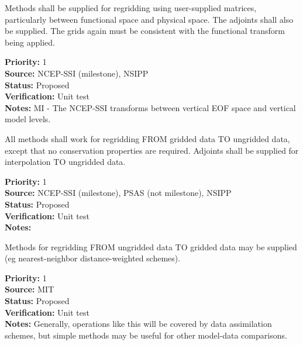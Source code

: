
Methods shall be supplied for regridding using user-supplied matrices,
particularly between functional space and physical space.
The adjoints shall also be supplied.  The grids again must be consistent
with the functional transform being applied.

\begin{reqlist}
{\bf Priority:} 1 \\
{\bf Source:}  NCEP-SSI (milestone), NSIPP \\
{\bf Status:} Proposed \\
{\bf Verification:} Unit test \\
{\bf Notes:} MI - The NCEP-SSI transforms between vertical EOF space
             and vertical model levels.
\end{reqlist}


All methods shall work for regridding FROM gridded data TO ungridded
data, except that no conservation properties are required.
Adjoints shall be supplied for interpolation TO ungridded data.

\begin{reqlist}
{\bf Priority:} 1 \\
{\bf Source:}  NCEP-SSI (milestone), PSAS (not milestone), NSIPP  \\
{\bf Status:} Proposed \\
{\bf Verification:} Unit test \\
{\bf Notes:} 
\end{reqlist}


Methods for regridding FROM ungridded data TO gridded data may be
supplied (eg nearest-neighbor distance-weighted schemes).

\begin{reqlist}
{\bf Priority:} 1 \\
{\bf Source:} MIT  \\
{\bf Status:} Proposed \\
{\bf Verification:} Unit test \\
{\bf Notes:} Generally, operations like this will be covered by
             data assimilation schemes, but simple methods may be useful
             for other model-data comparisons.
\end{reqlist}

